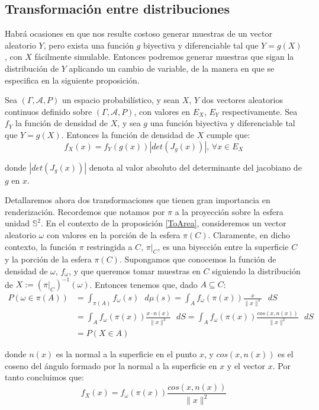 \subsection{Transformación entre distribuciones}

Habrá ocasiones en que nos resulte costoso generar muestras de un vector aleatorio $Y$, pero exista una función $g$ biyectiva y diferenciable tal que $Y=g(X)$, con $X$ fácilmente simulable. Entonces podremos generar muestras que sigan la distribución de $Y$ aplicando un cambio de variable, de la manera en que se especifica en la siguiente proposición.

\begin{proposicion}
Sea $(\Gamma,\mathcal{A}, P)$ un espacio probabilístico, y sean $X$, $Y$ dos vectores aleatorios continuos definido sobre $(\Gamma,\mathcal{A}, P)$, con valores en $E_X$, $E_Y$ respectivamente. Sea $f_Y$ la función de densidad de $X$, y sea $g$ una función biyectiva y diferenciable tal que $Y=g(X)$. Entonces la función de densidad de $X$ cumple que:
$$f_X(x) = f_Y(g(x))|det(J_g(x))|\text{, }\forall x\in E_X$$

donde $|det(J_g(x))|$ denota al valor absoluto del determinante del jacobiano de $g$ en $x$.
\end{proposicion}

Detallaremos ahora dos transformaciones que tienen gran importancia en renderización. Recordemos que notamos por $\pi$ a la proyección sobre la esfera unidad $\mathds{S}^2$. En el contexto de la proposición \ref{ToArea}, consideremos un vector aleatorio $\omega$ con valores en la porción de la esfera $\pi(C)$. Claramente, en dicho contexto, la función $\pi$ restringida a $C$, $\pi|_C$, es una biyección entre la superficie $C$ y la porción de la esfera $\pi(C)$. Supongamos que conocemos la función de densidad de $\omega$, $f_{\omega}$, y que queremos tomar muestras en $C$ siguiendo la distribución de $X:=(\pi|_C)^{-1}(\omega)$. Entonces tenemos que, dado $A\subseteq C$:
\begin{align*}
P(\omega\in \pi(A)) &= \int_{\pi(A)}f_{\omega}(s)\text{ }d\mu(s) = \int _A f_{\omega}(\pi(x)) \frac{x}{\|x\|^3} \text{ }dS \\
&= \int _A f_{\omega}(\pi(x)) \frac{x\cdot n(x)}{\|x\|^3} \text{ }dS = \int_A f_{\omega}(\pi(x)) \frac{cos(x,n(x))}{\|x\|^2} \text{ }dS\\
&= P(X\in A)
\end{align*}

donde $n(x)$ es la normal a la superficie en el punto $x$, y $cos(x,n(x))$ es el coseno del ángulo formado por la normal a la superficie en $x$ y el vector $x$. Por tanto concluimos que: 
\begin{equation}\label{cambioArea}
f_X(x) = f_{\omega}(\pi(x))\frac{cos(x,n(x))}{\|x\|^2}
\end{equation}

